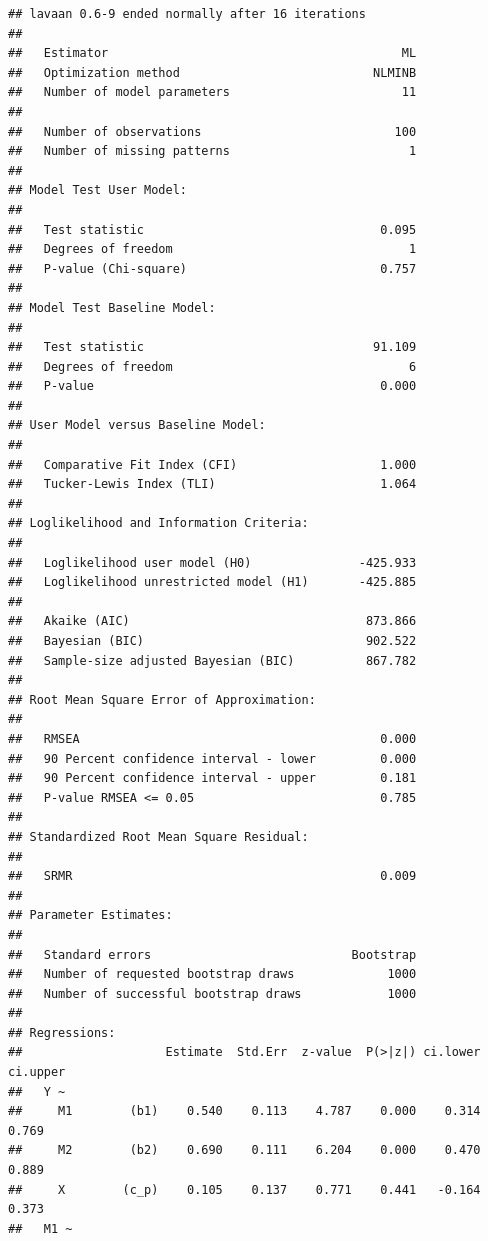 \documentclass[
]{book}
\begin{document}
\begin{verbatim}
## lavaan 0.6-9 ended normally after 16 iterations
## 
##   Estimator                                         ML
##   Optimization method                           NLMINB
##   Number of model parameters                        11
##                                                       
##   Number of observations                           100
##   Number of missing patterns                         1
##                                                       
## Model Test User Model:
##                                                       
##   Test statistic                                 0.095
##   Degrees of freedom                                 1
##   P-value (Chi-square)                           0.757
## 
## Model Test Baseline Model:
## 
##   Test statistic                                91.109
##   Degrees of freedom                                 6
##   P-value                                        0.000
## 
## User Model versus Baseline Model:
## 
##   Comparative Fit Index (CFI)                    1.000
##   Tucker-Lewis Index (TLI)                       1.064
## 
## Loglikelihood and Information Criteria:
## 
##   Loglikelihood user model (H0)               -425.933
##   Loglikelihood unrestricted model (H1)       -425.885
##                                                       
##   Akaike (AIC)                                 873.866
##   Bayesian (BIC)                               902.522
##   Sample-size adjusted Bayesian (BIC)          867.782
## 
## Root Mean Square Error of Approximation:
## 
##   RMSEA                                          0.000
##   90 Percent confidence interval - lower         0.000
##   90 Percent confidence interval - upper         0.181
##   P-value RMSEA <= 0.05                          0.785
## 
## Standardized Root Mean Square Residual:
## 
##   SRMR                                           0.009
## 
## Parameter Estimates:
## 
##   Standard errors                            Bootstrap
##   Number of requested bootstrap draws             1000
##   Number of successful bootstrap draws            1000
## 
## Regressions:
##                    Estimate  Std.Err  z-value  P(>|z|) ci.lower ci.upper
##   Y ~                                                                   
##     M1        (b1)    0.540    0.113    4.787    0.000    0.314    0.769
##     M2        (b2)    0.690    0.111    6.204    0.000    0.470    0.889
##     X        (c_p)    0.105    0.137    0.771    0.441   -0.164    0.373
##   M1 ~                                                                  

\end{verbatim}
\end{document}
